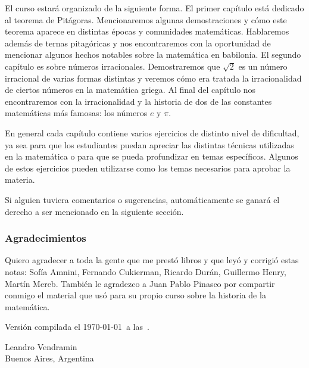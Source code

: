El curso estará organizado de la siguiente forma.  El primer capítulo está
dedicado al teorema de Pitágoras. Mencionaremos algunas demostraciones y cómo
este teorema aparece en distintas épocas y comunidades matemáticas. Hablaremos
además de ternas pitagóricas y nos encontraremos con la oportunidad de
mencionar algunos hechos notables sobre la matemática en babilonia.  El segundo
capítulo es sobre números irracionales. Demostraremos que $\sqrt{2}$ es un
número irracional de varias formas distintas y veremos cómo era tratada la
irracionalidad de ciertos números en la matemática griega. Al final del
capítulo nos encontraremos con la irracionalidad y la historia de dos de las
constantes matemáticas más famosas: los números $e$ y $\pi$. 

En general cada capítulo contiene varios ejercicios de distinto nivel de
dificultad, ya sea para que los estudiantes puedan apreciar las distintas
técnicas utilizadas en la matemática o para que se pueda profundizar en temas
específicos. Algunos de estos ejercicios pueden utilizarse como los temas
necesarios para aprobar la materia. 

Si alguien tuviera comentarios o sugerencias, automáticamente se ganará el
derecho a ser mencionado en la siguiente sección.

\subsubsection*{Agradecimientos}

Quiero agradecer a toda la gente que me prestó libros y que leyó y corrigió
estas notas: Sofía Amnini, Fernando Cukierman, Ricardo Durán, Guillermo Henry, Martín Mereb. También le agradezco a Juan Pablo
Pinasco por compartir conmigo el material que usó para su propio curso sobre la
historia de la matemática. 

\medskip
Versión compilada el \today~a las~\currenttime.

\bigskip
\begin{flushright}
Leandro Vendramin\\Buenos Aires, Argentina\par
\end{flushright}

